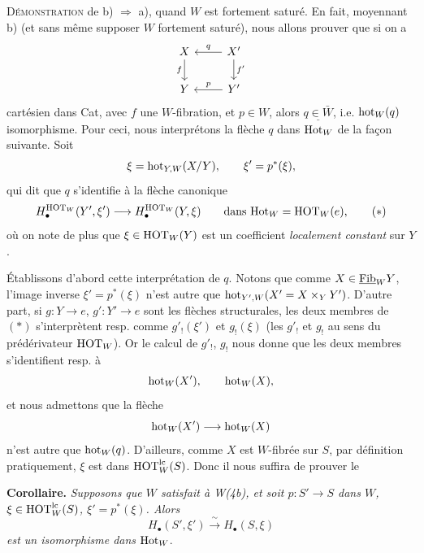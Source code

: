 \textsc{Démonstration} de b) $\Longrightarrow$ a), quand $W$ est fortement saturé. En fait, moyennant b) (et sans même supposer $W$ fortement saturé), nous allons prouver que si on a
\[
\begin{tikzcd}
X & X' \arrow[l,"q"'] \arrow[d,"f'"] \\
Y \arrow[from=u,"f"'] & Y' \arrow[l,"p"']
\end{tikzcd}
\]
cartésien dans Cat, avec
$f$ une $W$-fibration, et $p \in W$, alors $\underline{q \in \bar{W}}$, i.e. $\mathrm{hot}_W(q)$ isomorphisme. Pour ceci, nous interprétons la flèche $q$ dans $\mathrm{Hot}_W$ de la façon suivante. Soit
\[
\xi = \mathrm{hot}_{Y,W}(X/Y), \qquad \xi' = p^*(\xi),
\]
qui dit que $q$ s'identifie à la flèche canonique
\[
H_\bullet^{\mathrm{HOT}_W}(Y',\xi') \longrightarrow H_\bullet^{\mathrm{HOT}_W}(Y,\xi) \qquad \text{dans } \mathrm{Hot}_W = \mathrm{HOT}_W(e), \tag*{$(*)$}
\]
où on note de plus que $\xi \in \mathrm{HOT}_W(Y)$ est un coefficient \textit{localement constant} sur $Y$.

Établissons d'abord cette interprétation de $q$. Notons que comme $X \in \underline{\mathrm{Fib}}_W Y$, l'image inverse $\xi' = p^*(\xi)$ n'est autre que $\mathrm{hot}_{Y',W}(X' = X \times_Y Y')$. D'autre part, si $g : Y \longrightarrow e$, $g' : Y' \longrightarrow e$ sont les flèches structurales, les deux membres de $(*)$ s'interprètent resp. comme $g'_!(\xi')$ et $g_!(\xi)$ (les $g'_!$ et $g_!$ au sens du prédérivateur $\mathrm{HOT}_W$). Or le calcul de $g'_!$, $g_!$ nous donne que les deux membres s'identifient resp. à
\[
\mathrm{hot}_W(X'), \qquad \mathrm{hot}_W(X),
\]
et nous admettons que la flèche
\[
\mathrm{hot}_W(X') \longrightarrow \mathrm{hot}_W(X)
\]
n'est autre que $\mathrm{hot}_W(q)$. D'ailleurs, comme $X$ est $W$-fibrée sur $S$, par définition pratiquement, $\xi$ est dans $\mathrm{HOT}^{\mathrm{lc}}_W(S)$. Donc il nous suffira de prouver le


\textbf{Corollaire.} \textit{Supposons que $W$ satisfait à W(4b), et soit $p : S' \longrightarrow S$ dans $W$, $\xi \in \mathrm{HOT}^{\mathrm{lc}}_W(S)$, $\xi' = p^*(\xi)$. Alors}
\[
H_\bullet(S',\xi') \xrightarrow{\ \sim\ } H_\bullet(S,\xi)
\]
\textit{est un isomorphisme dans} $\mathrm{Hot}_W$.

